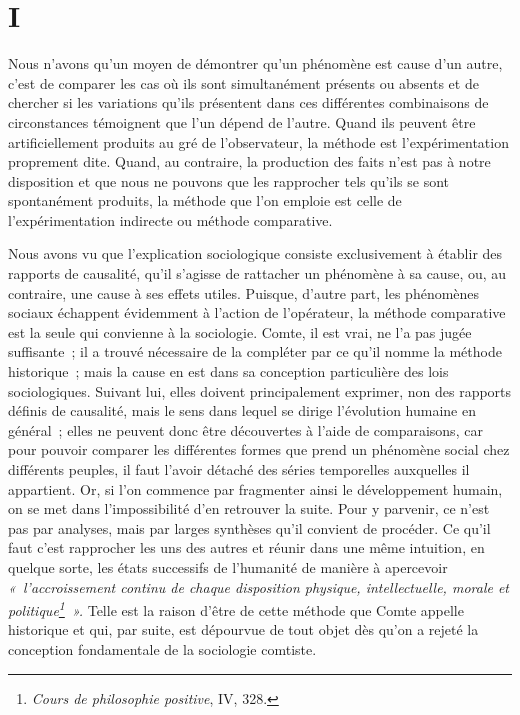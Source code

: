 \documentclass[french,twoside]{book} %
\newcommand\chaptercont{} %
\begin{document}
\chaptercont
\section[{I}]{I}
\noindent Nous n’avons qu’un moyen de démontrer qu’un phénomène est cause d’un autre, c’est de comparer les cas où ils sont simultanément présents ou absents et de chercher si les variations qu’ils présentent dans ces différentes combinaisons de circonstances témoignent que l’un dépend de l’autre. Quand ils peuvent être artificiellement produits au gré de l’observateur, la méthode est l’expérimentation proprement dite. Quand, au contraire, la production des faits n’est pas à notre disposition et que nous ne pouvons que les rapprocher tels qu’ils se sont spontanément produits, la méthode que l’on emploie est celle de l’expérimentation indirecte ou méthode comparative.\par
Nous avons vu que l’explication sociologique consiste exclusivement à établir des rapports de causalité, qu’il s’agisse de rattacher un phénomène à sa cause, ou, au contraire, une cause à ses effets utiles. Puisque, d’autre part, les phénomènes sociaux échappent évidemment à l’action de l’opérateur, la méthode comparative est la seule qui convienne à la sociologie. Comte, il est vrai, ne l’a pas jugée suffisante ; il a trouvé nécessaire de la compléter par ce qu’il nomme la méthode historique ; mais la cause en est dans sa conception particulière des lois sociologiques. Suivant lui, elles doivent principalement exprimer, non des rapports définis de causalité, mais le sens dans lequel se dirige l’évolution humaine en général ; elles ne peuvent donc être découvertes à l’aide de comparaisons, car pour pouvoir comparer les différentes formes que prend un phénomène social chez différents peuples, il faut l’avoir détaché des séries temporelles auxquelles il appartient. Or, si l’on commence par fragmenter ainsi le développement humain, on se met dans l’impossibilité d’en retrouver la suite. Pour y parvenir, ce n’est pas par analyses, mais par larges synthèses qu’il convient de procéder. Ce qu’il faut c’est rapprocher les uns des autres et réunir dans une même intuition, en quelque sorte, les états successifs de l’humanité de manière à apercevoir \emph{« l’accroissement continu de chaque disposition physique, intellectuelle, morale et politique\footnote{\emph{Cours de philosophie positive}, IV, 328.} ».} Telle est la raison d’être de cette méthode que Comte appelle historique et qui, par suite, est dépourvue de tout objet dès qu’on a rejeté la conception fondamentale de la sociologie comtiste.\par
\end{document}

